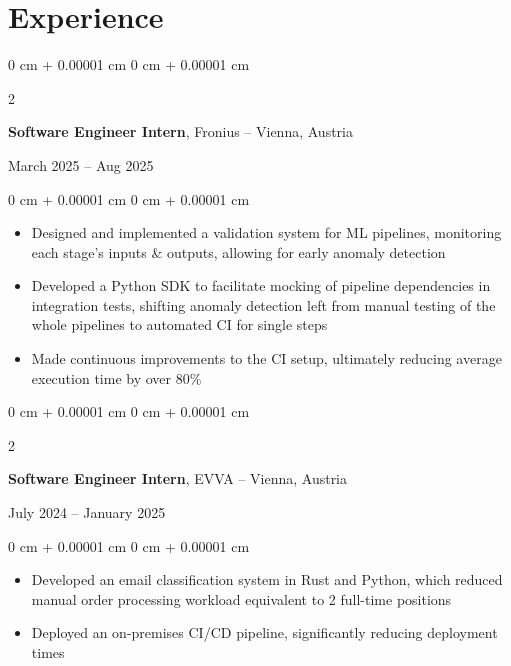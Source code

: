 \documentclass[10pt, letterpaper]{article}
\newenvironment{highlights}{
    \begin{itemize}[
        topsep=0.10 cm,
        parsep=0.10 cm,
        partopsep=0pt,
        itemsep=0pt,
        leftmargin=0 cm + 10pt
    ]
}{
    \end{itemize}
}
\newenvironment{onecolentry}{
    \begin{adjustwidth}{
        0 cm + 0.00001 cm
    }{
        0 cm + 0.00001 cm
    }
}{
    \end{adjustwidth}
}
\newenvironment{twocolentry}[2][]{
    \onecolentry
    \def\secondColumn{#2}
    \setcolumnwidth{\fill, 4.5 cm}
    \begin{paracol}{2}
}{
    \switchcolumn \raggedleft \secondColumn
    \end{paracol}
    \endonecolentry
}
\begin{document}
    \section{Experience}
        
    \begin{twocolentry}
        {March 2025 – Aug 2025}
        \textbf{Software Engineer Intern}, Fronius -- Vienna, Austria
    \end{twocolentry}

    \vspace{0.10 cm}
    
    \begin{onecolentry}
        \begin{highlights}
            \item Designed and implemented a validation system for ML pipelines, monitoring each stage's inputs \& outputs, allowing for early anomaly detection
            \item Developed a Python SDK to facilitate mocking of pipeline dependencies in integration tests, shifting anomaly detection left from manual testing of the whole pipelines to automated CI for single steps 
            \item Made continuous improvements to the CI setup, ultimately reducing average execution time by over 80\%
        \end{highlights}
    \end{onecolentry}

    \vspace{0.2 cm}

    \begin{twocolentry}
        {July 2024 – January 2025}
        \textbf{Software Engineer Intern}, EVVA -- Vienna, Austria
    \end{twocolentry}

    \vspace{0.10 cm}
    
    \begin{onecolentry}
        \begin{highlights}
            \item Developed an email classification system in Rust and Python, which reduced manual order processing workload equivalent to 2 full-time positions
            \item Deployed an on-premises CI/CD pipeline, significantly reducing deployment times 
        \end{highlights}
    \end{onecolentry}
\end{document}
